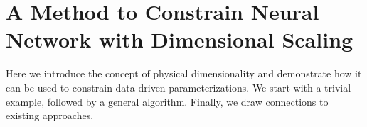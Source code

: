 \documentclass[draft]{agujournal2019}
\begin{document}


\section{A Method to Constrain Neural Network with Dimensional Scaling} \label{sec:unit_invariance}

Here we introduce the concept of physical dimensionality and demonstrate how it can be used to constrain data-driven parameterizations. %
We start with a trivial example, followed by a general algorithm. Finally, we draw connections to existing approaches.


\end{document}
